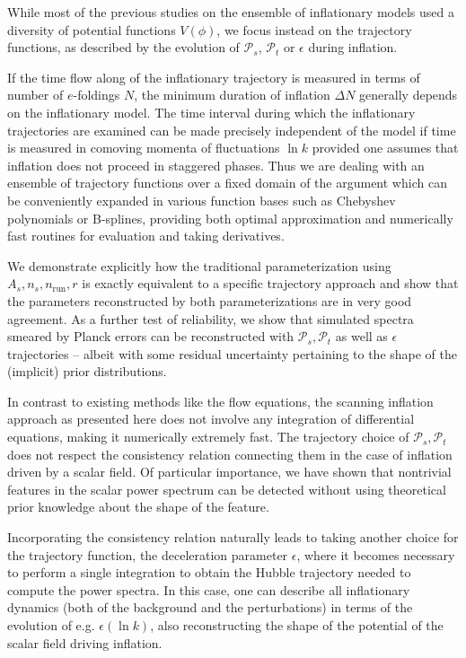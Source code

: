 \documentclass[a4paper,11pt]{article}
\newcommand{\pscalar}{{\mathcal{P}_s}}
\newcommand{\ptensor}{{\mathcal{P}_t}}
\begin{document}
While most of the previous studies on the ensemble of inflationary
models used a diversity of potential functions $V(\phi)$, we focus
instead on the trajectory functions, as described by the evolution of
$\pscalar$, $\ptensor$ or $\epsilon$ during inflation.

If the time flow along of the inflationary trajectory is measured in
terms of number of $e$-foldings $N$, the minimum duration of inflation
$\Delta N$ generally depends on the inflationary model. The time
interval during which the inflationary trajectories are examined can
be made precisely independent of the model if time is measured in
comoving momenta of fluctuations $\ln k$ provided one assumes that
inflation does not proceed in staggered phases. Thus we are dealing
with an ensemble of trajectory functions over a fixed domain of the
argument which can be conveniently expanded in various function bases
such as Chebyshev polynomials or B-splines, providing both optimal
approximation and numerically fast routines for evaluation and taking
derivatives.

We demonstrate explicitly how the traditional parameterization using
$A_s, n_s, n_{\mathrm{run}}, r$ is exactly equivalent to a specific
trajectory approach and show that the parameters reconstructed by both
parameterizations are in very good agreement. As a further test of
reliability, we show that simulated spectra smeared by Planck errors
can be reconstructed with $\pscalar, \ptensor$ as well as
$\epsilon$ trajectories -- albeit with some residual uncertainty
pertaining to the shape of the (implicit) prior distributions.

In contrast to existing methods like the flow equations, the scanning
inflation approach as presented here does not involve any integration
of differential equations, making it numerically extremely fast. The
trajectory choice of $\pscalar, \ptensor$ does not respect the
consistency relation connecting them in the case of inflation driven
by a scalar field. Of particular importance, we have shown that
nontrivial features in the scalar power spectrum can be detected
without using theoretical prior knowledge about the shape of the
feature.

Incorporating the consistency relation naturally leads to taking
another choice for the trajectory function, the deceleration parameter
$\epsilon$, where it becomes necessary to perform a single integration
to obtain the Hubble trajectory needed to compute the power
spectra. In this case, one can describe all inflationary dynamics
(both of the background and the perturbations) in terms of the
evolution of e.g. $\epsilon(\ln k)$, also reconstructing the shape of
the potential of the scalar field driving inflation.
\end{document}
